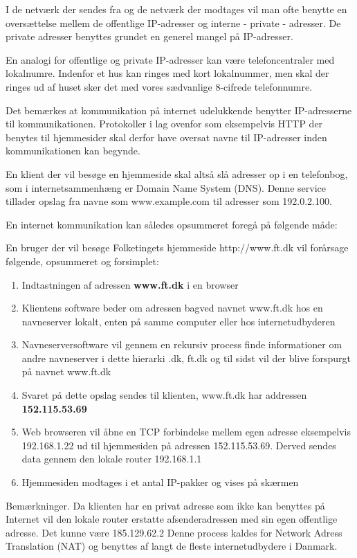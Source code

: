 \documentclass[a4paper,11pt,notitlepage]{report}
\begin{document}
I de netværk der sendes fra og de netværk der modtages vil man ofte benytte en oversættelse mellem de offentlige IP-adresser og interne - private - adresser. De private adresser benyttes grundet en generel mangel på IP-adresser.

En analogi for offentlige og private IP-adresser kan være telefoncentraler med lokalnumre. Indenfor et hus kan ringes med kort lokalnummer, men skal der ringes ud af huset sker det med vores sædvanlige 8-cifrede telefonnumre.

Det bemærkes at kommunikation på internet udelukkende benytter IP-adresserne til kommunikationen. Protokoller i lag ovenfor som eksempelvis HTTP der benytes til hjemmesider skal derfor have oversat navne til IP-adresser inden kommunikationen kan begynde.

En klient der vil besøge en hjemmeside skal altså slå adresser op i en telefonbog, som i internetsammenhæng er Domain Name System (DNS). Denne service tillader opslag fra navne som www.example.com til adresser som 192.0.2.100.

En internet kommunikation kan således opsummeret foregå på følgende måde:

En bruger der vil besøge Folketingets hjemmeside http://www.ft.dk vil forårsage følgende, opsummeret og forsimplet:
\begin{enumerate}
\item Indtastningen af adressen {\bf www.ft.dk} i en browser
\item Klientens software beder om adressen bagved navnet www.ft.dk hos en navneserver lokalt, enten på samme computer eller hos internetudbyderen
\item Navneserversoftware vil gennem en rekursiv process finde informationer om andre navneserver i dette hierarki .dk, ft.dk og til sidst vil der blive forspurgt på navnet www.ft.dk
\item Svaret på dette opslag sendes til klienten, www.ft.dk har addressen {\bf 152.115.53.69}
\item Web browseren vil åbne en TCP forbindelse mellem egen adresse eksempelvis 192.168.1.22 ud til hjemmesiden på adressen 152.115.53.69. Derved sendes data gennem den lokale router 192.168.1.1
\item Hjemmesiden modtages i et antal IP-pakker og vises på skærmen
\end{enumerate}

Bemærkninger.
Da klienten har en privat adresse som ikke kan benyttes på Internet vil den lokale router erstatte afsenderadressen med sin egen offentlige adresse. Det kunne være 185.129.62.2 Denne process kaldes for Network Adress Translation (NAT) og benyttes af langt de fleste internetudbydere i Danmark.
\end{document}
